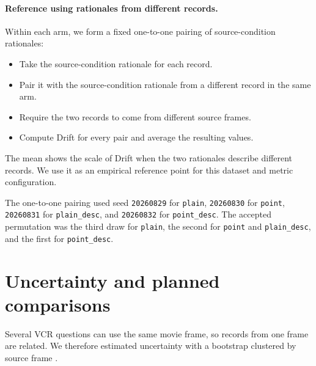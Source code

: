 \paragraph{Reference using rationales from different records.}
Within each arm, we form a fixed one-to-one pairing of source-condition
rationales:

\begin{itemize}
  \item Take the source-condition rationale for each record.
  \item Pair it with the source-condition rationale from a different record in
        the same arm.
  \item Require the two records to come from different source frames.
  \item Compute Drift for every pair and average the resulting values.
\end{itemize}

The mean shows the scale of Drift when the two rationales describe different
records. We use it as an empirical reference point for this dataset and metric
configuration.

The one-to-one pairing used seed \texttt{20260829} for \texttt{plain},
\texttt{20260830} for \texttt{point}, \texttt{20260831} for
\texttt{plain\_desc}, and \texttt{20260832} for \texttt{point\_desc}. The
accepted permutation was the third draw for \texttt{plain}, the second for
\texttt{point} and \texttt{plain\_desc}, and the first for
\texttt{point\_desc}.

\section{Uncertainty and planned comparisons}
\label{sec:framework-statistics}

Several VCR questions can use the same movie frame, so records from one frame
are related. We therefore estimated uncertainty with a bootstrap clustered by
source frame \citep{DBLP:books/sp/EfronT93}.

